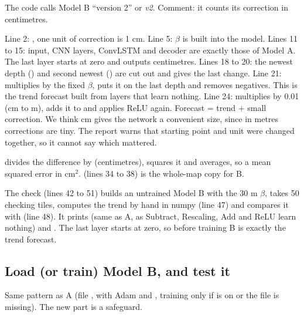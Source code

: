The code calls Model B ``version 2'' or \emph{v2}. Comment: it counts its correction in centimetres.


Line 2: , one unit of correction is 1 cm. Line 5: $\beta$ is built into the model. Lines 11 to 15: input, CNN layers, ConvLSTM and decoder are exactly those of Model A. The last layer  starts at zero and outputs centimetres. Lines 18 to 20: the newest depth () and second newest () are cut out and  gives the last change. Line 21:  multiplies by the fixed $\beta$,  puts it on the last depth and  removes negatives. This  is the trend forecast built from layers that learn nothing. Line 24:  multiplies by 0.01 (cm to m), adds it to  and applies ReLU again. Forecast = trend + small correction. We think cm gives the network a convenient size, since in metres corrections are tiny. The report warns that starting point and unit were changed together, so it cannot say which mattered.

 divides the difference by  (centimetres),  squares it and  averages, so a mean squared error in cm$^2$.  (lines 34 to 38) is the whole-map copy for B.

The check (lines 42 to 51) builds an untrained Model B with the 30 m $\beta$, takes 50 checking tiles, computes the trend by hand in numpy (line 47) and compares it with  (line 48). It prints  (same as A, as Subtract, Rescaling, Add and ReLU learn nothing) and . The last layer starts at zero, so before training B is exactly the trend forecast.


\subsection{Load (or train) Model B, and test it}

Same pattern as A (file ,  with Adam and , training only if  is on or the file is missing). The new part is a safeguard.

